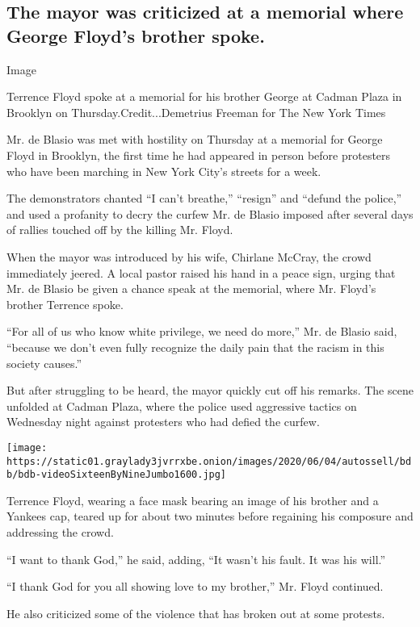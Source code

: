 \hypertarget{the-mayor-was-criticized-at-a-memorial-where-george-floyds-brother-spoke}{%
\subsection{The mayor was criticized at a memorial where George Floyd's
brother
spoke.}\label{the-mayor-was-criticized-at-a-memorial-where-george-floyds-brother-spoke}}

Image

Terrence Floyd spoke at a memorial for his brother George at Cadman
Plaza in Brooklyn on Thursday.Credit...Demetrius Freeman for The New
York Times

Mr. de Blasio was met with hostility on Thursday at a memorial for
George Floyd in Brooklyn, the first time he had appeared in person
before protesters who have been marching in New York City's streets for
a week.

The demonstrators chanted ``I can't breathe,'' ``resign'' and ``defund
the police,'' and used a profanity to decry the curfew Mr. de Blasio
imposed after several days of rallies touched off by the killing Mr.
Floyd.

When the mayor was introduced by his wife, Chirlane McCray, the crowd
immediately jeered. A local pastor raised his hand in a peace sign,
urging that Mr. de Blasio be given a chance speak at the memorial, where
Mr. Floyd's brother Terrence spoke.

``For all of us who know white privilege, we need do more,'' Mr. de
Blasio said, ``because we don't even fully recognize the daily pain that
the racism in this society causes.''

But after struggling to be heard, the mayor quickly cut off his remarks.
The scene unfolded at Cadman Plaza, where the police used aggressive
tactics on Wednesday night against protesters who had defied the curfew.

\texttt{[image: https://static01.graylady3jvrrxbe.onion/images/2020/06/04/autossell/bdb/bdb-videoSixteenByNineJumbo1600.jpg]}

Terrence Floyd, wearing a face mask bearing an image of his brother and
a Yankees cap, teared up for about two minutes before regaining his
composure and addressing the crowd.

``I want to thank God,'' he said, adding, ``It wasn't his fault. It was
his will.''

``I thank God for you all showing love to my brother,'' Mr. Floyd
continued.

He also criticized some of the violence that has broken out at some
protests.

